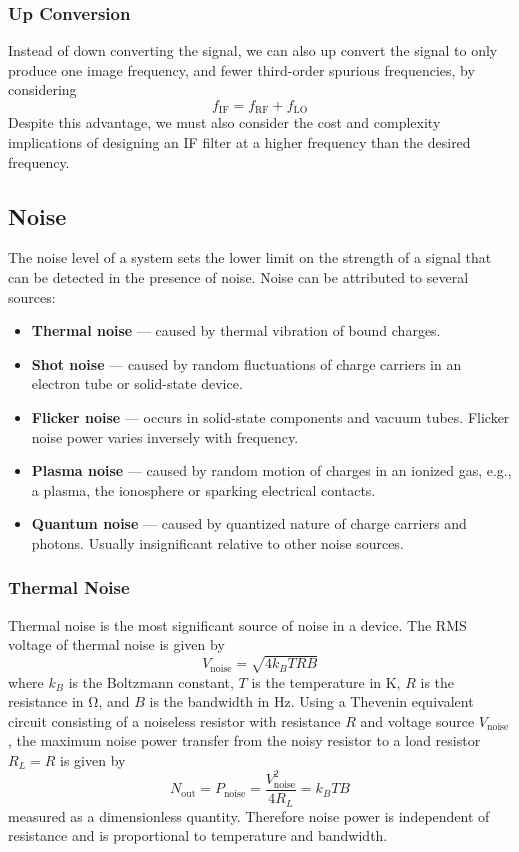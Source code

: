 \documentclass{article}
\begin{document}
\subsubsection{Up Conversion}
Instead of down converting the signal, we can also up convert the
signal to only produce one image frequency, and fewer third-order
spurious frequencies, by considering
\begin{equation*}
    f_{\mathrm{IF}} = f_{\mathrm{RF}} + f_{\mathrm{LO}}
\end{equation*}
Despite this advantage, we must also consider the cost and complexity
implications of designing an IF filter at a higher frequency than the
desired frequency.
\subsection{Noise}
The noise level of a system sets the lower limit on the strength of a
signal that can be detected in the presence of noise. Noise can be
attributed to several sources:
\begin{itemize}
    \item \textbf{Thermal noise} --- caused by thermal vibration of bound
          charges.
    \item \textbf{Shot noise} --- caused by random fluctuations of
          charge carriers in an electron tube or solid-state device.
    \item \textbf{Flicker noise} --- occurs in solid-state components and
          vacuum tubes. Flicker noise power varies inversely with frequency.
    \item \textbf{Plasma noise} --- caused by random motion of charges in
          an ionized gas, e.g., a plasma, the ionosphere or sparking electrical
          contacts.
    \item \textbf{Quantum noise} --- caused by quantized nature of charge
          carriers and photons. Usually insignificant relative to other noise
          sources.
\end{itemize}
\subsubsection{Thermal Noise}
Thermal noise is the most significant source of noise in a device. The
RMS voltage of thermal noise is given by
\begin{equation*}
    V_{\mathrm{noise}} = \sqrt{4 k_B T R B}
\end{equation*}
where \(k_B\) is the Boltzmann constant, \(T\) is the temperature in
\unit{K}, \(R\) is the resistance in \unit{\ohm}, and \(B\) is the
bandwidth in \unit{Hz}. Using a Thevenin equivalent circuit consisting
of a noiseless resistor with resistance \(R\) and voltage source
\(V_{\mathrm{noise}}\), the maximum noise power transfer from the noisy
resistor to a load resistor \(R_L = R\) is given by
\begin{equation*}
    N_\mathrm{out} = P_{\mathrm{noise}} = \frac{V_{\mathrm{noise}}^2}{4R_L} = k_B T B
\end{equation*}
measured as a dimensionless quantity. Therefore noise power is
independent of resistance and is proportional to temperature and bandwidth.
\end{document}
